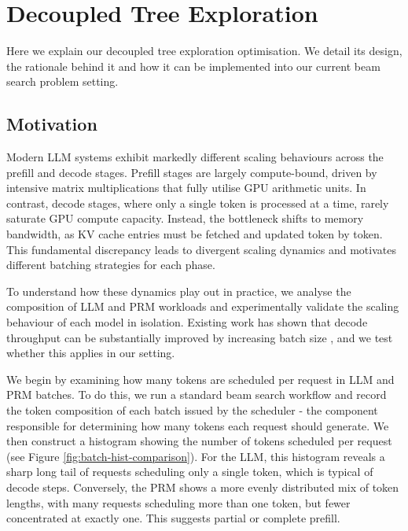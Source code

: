 \documentclass[12pt,twoside]{report}
\begin{document}
\chapter{Decoupled Tree Exploration}
Here we explain our decoupled tree exploration optimisation.
We detail its design, the rationale behind it and how it can be implemented into our current beam search problem setting.

\section{Motivation}
Modern LLM systems exhibit markedly different scaling behaviours across the prefill and decode stages. 
Prefill stages are largely compute-bound, driven by intensive matrix multiplications that fully utilise GPU arithmetic units. 
In contrast, decode stages, where only a single token is processed at a time, rarely saturate GPU compute capacity. 
Instead, the bottleneck shifts to memory bandwidth, as KV cache entries must be fetched and updated token by token. 
This fundamental discrepancy leads to divergent scaling dynamics and motivates different batching strategies for each phase.

To understand how these dynamics play out in practice, we analyse the composition of LLM and PRM workloads and experimentally validate the scaling behaviour of each model in isolation. 
Existing work has shown that decode throughput can be substantially improved by increasing batch size \cite{agrawal2024taming}, and we test whether this applies in our setting.

We begin by examining how many tokens are scheduled per request in LLM and PRM batches. 
To do this, we run a standard beam search workflow and record the token composition of each batch issued by the scheduler - the component responsible for determining how many tokens each request should generate. 
We then construct a histogram showing the number of tokens scheduled per request (see Figure \ref{fig:batch-hist-comparison}). 
For the LLM, this histogram reveals a sharp long tail of requests scheduling only a single token, which is typical of decode steps. 
Conversely, the PRM shows a more evenly distributed mix of token lengths, with many requests scheduling more than one token, but fewer concentrated at exactly one. This suggests partial or complete prefill.
\end{document}
